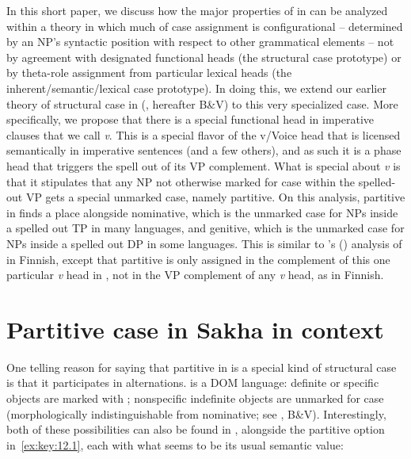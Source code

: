 \documentclass[output=paper]{langsci/langscibook}
\begin{document}
\largerpage[1]
In this short paper, we discuss how the major properties of  in  can be analyzed within a theory in which much of case assignment
is configurational -- determined by an NP’s syntactic position with respect to
other grammatical elements -- not by agreement with designated functional heads
(the structural case prototype) or by theta-role assignment from particular
lexical heads (the inherent/semantic/lexical case prototype). In doing this, we
extend our earlier theory of structural case in 
(\citealt{BakVin2010}, hereafter B\&V) to this very specialized case. More
specifically, we propose that there is a special functional head in imperative
clauses that we call \emph{v}\textsubscript{\Imp}. This is a special flavor of
the v/Voice head that is licensed semantically in imperative sentences (and a
few others), and as such it is a phase head that triggers the spell out of its
VP complement. What is special about \emph{v}\textsubscript{\Imp} is that it
stipulates that any NP not otherwise marked for case within the spelled-out VP
gets a special unmarked case, namely partitive. On this analysis, partitive in
 finds a place alongside nominative, which is the unmarked case for
NPs inside a spelled out TP in many languages, and genitive,
which is the unmarked case for NPs inside a spelled out DP in some languages.
This is similar to \citeauthor{Baker2015}'s (\citeyear[140--145]{Baker2015})
analysis of  in Finnish, except that partitive is only
assigned in the complement of this one particular \emph{v} head in ,
not in the VP complement of any \emph{v} head, as in Finnish.

\section{Partitive case in Sakha in context}

One telling reason for saying that partitive in  is a special kind
of structural case is that it participates in alternations.  is a
\gls{DOM} language: definite or specific objects are marked with
; nonspecific indefinite objects are unmarked for case
(morphologically indistinguishable from nominative; see
\citealt{Vinokurova2005}, B\&V).  Interestingly, both of these possibilities
can also be found in , alongside the partitive option
in~\eqref{ex:key:12.1}, each with what seems to be its usual semantic value:
\end{document}
